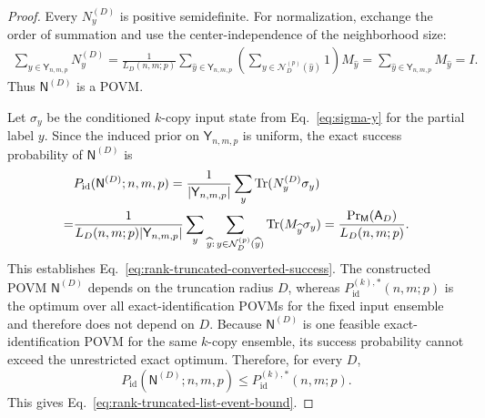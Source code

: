 \documentclass[11pt]{article}
\newcommand{\Tr}{\operatorname{Tr}}
\newcommand{\1}{\mathbf 1}
\theoremstyle{plain}
\theoremstyle{definition}
\theoremstyle{remark}
\begin{document}
\begin{proof}
Every $N_y^{(D)}$ is positive semidefinite.  For normalization, exchange the
order of summation and use the center-independence of the neighborhood size:
\begin{align}
 \sum_{y\in\mathsf Y_{n,m,p}}N_y^{(D)}
 =\frac1{L_D(n,m;p)}
 \sum_{\widehat y\in\mathsf Y_{n,m,p}}
 \left(
 \sum_{y\in\mathcal N_D^{(p)}(\widehat y)}1
 \right)M_{\widehat y}
 =\sum_{\widehat y\in\mathsf Y_{n,m,p}}M_{\widehat y}
 =I.
 \label{eq:rank-truncated-povm-normalization}
\end{align}
Thus $\mathsf N^{(D)}$ is a POVM.

Let $\sigma_y$ be the conditioned $k$-copy input state from
Eq.~\eqref{eq:sigma-y} for the partial label $y$.  Since the induced prior on $\mathsf Y_{n,m,p}$ is uniform, the exact
success probability of $\mathsf N^{(D)}$ is
\begin{align}
 &P_{\mathrm{id}}(\mathsf N^{(D)};n,m,p)
 =\frac1{|\mathsf Y_{n,m,p}|}
 \sum_y\Tr(N_y^{(D)}\sigma_y)\notag\\
 =&\frac1{L_D(n,m;p)|\mathsf Y_{n,m,p}|}
 \sum_y\sum_{\widehat y:\,y\in\mathcal N_D^{(p)}(\widehat y)}
 \Tr(M_{\widehat y}\sigma_y)
 =\frac{\Pr_{\mathsf M}(\mathsf A_D)}{L_D(n,m;p)}.
 \label{eq:rank-truncated-success-calculation}
\end{align}
This establishes Eq.~\eqref{eq:rank-truncated-converted-success}.  The constructed
POVM $\mathsf N^{(D)}$ depends on the truncation radius $D$, whereas
$P_{\mathrm{id}}^{(k),*}(n,m;p)$ is the optimum over all exact-identification
POVMs for the fixed input ensemble and therefore does not depend on $D$.
Because $\mathsf N^{(D)}$ is one feasible exact-identification POVM for
the same $k$-copy ensemble, its success probability cannot exceed the
unrestricted exact optimum.  Therefore, for every $D$,
\[
 P_{\mathrm{id}}(\mathsf N^{(D)};n,m,p)
 \le P_{\mathrm{id}}^{(k),*}(n,m;p).
\]
This gives Eq.~\eqref{eq:rank-truncated-list-event-bound}.
\end{proof}
\end{document}
